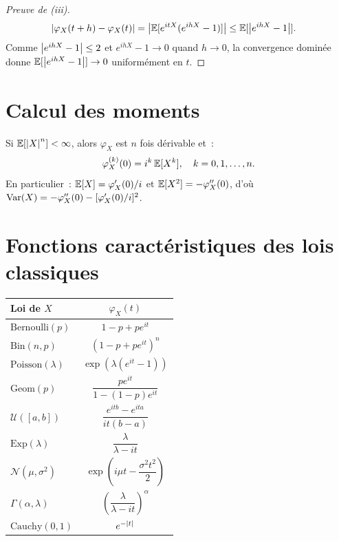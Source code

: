 \begin{proof}[Preuve de (iii)]
\begin{align*}
    \left| \varphi_X(t+h) - \varphi_X(t) \right|
    &= \left| \mathbb{E}[e^{itX}(e^{ihX} - 1)] \right|
    \leq \mathbb{E}[\left| e^{ihX} - 1 \right|].
\end{align*}
Comme $\left| e^{ihX} - 1 \right| \leq 2$ et $e^{ihX} - 1 \to 0$ quand $h \to 0$,
la convergence domin\'ee donne $\mathbb{E}[\left| e^{ihX}-1 \right|] \to 0$ uniform\'ement en $t$.
\end{proof}

\section{Calcul des moments}

\begin{theoreme}
Si $\mathbb{E}[\left| X \right|^n] < \infty$, alors $\varphi_X$ est $n$ fois d\'erivable et~:
\[
    \varphi_X^{(k)}(0) = i^k\, \mathbb{E}[X^k], \quad k = 0, 1, \ldots, n.
\]
En particulier~:
$\mathbb{E}[X] = \varphi_X'(0)/i$ et
$\mathbb{E}[X^2] = -\varphi_X''(0)$, d'o\`u
$\mathrm{Var}(X) = -\varphi_X''(0) - [\varphi_X'(0)/i]^2$.
\end{theoreme}

\section{Fonctions caract\'eristiques des lois classiques}

\begin{formules}[title=\textbf{Table des fonctions caract\'eristiques}]
\begin{center}
\renewcommand{\arraystretch}{1.5}
\begin{tabular}{lc}
    \toprule
    \textbf{Loi de $X$} & $\varphi_X(t)$ \\
    \midrule
    $\text{Bernoulli}(p)$ & $1 - p + pe^{it}$ \\
    $\text{Bin}(n,p)$ & $(1-p+pe^{it})^n$ \\
    $\text{Poisson}(\lambda)$ & $\exp(\lambda(e^{it}-1))$ \\
    $\text{Geom}(p)$ & $\dfrac{pe^{it}}{1-(1-p)e^{it}}$ \\[4pt]
    $\mathcal{U}([a,b])$ & $\dfrac{e^{itb}-e^{ita}}{it(b-a)}$ \\[4pt]
    $\text{Exp}(\lambda)$ & $\dfrac{\lambda}{\lambda - it}$ \\[4pt]
    $\mathcal{N}(\mu, \sigma^2)$ & $\exp\!\left(i\mu t - \dfrac{\sigma^2 t^2}{2}\right)$ \\[4pt]
    $\Gamma(\alpha, \lambda)$ & $\left(\dfrac{\lambda}{\lambda - it}\right)^\alpha$ \\[4pt]
    $\text{Cauchy}(0,1)$ & $e^{-\left| t \right|}$ \\
    \bottomrule
\end{tabular}
\end{center}
\end{formules}


